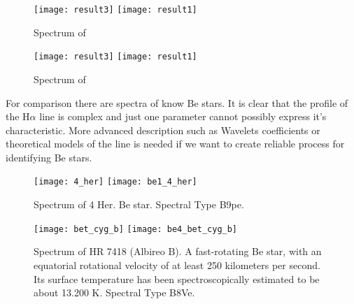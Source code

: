    \begin{figure}[!htbp]
      \begin{center}
        \leavevmode
        \ifpdf
        \texttt{[image: result3]}
        \else
        \texttt{[image: result1]}
        \fi
        \caption{Spectrum of }
        \label{FigResult3}
      \end{center}
    \end{figure}

   \begin{figure}[!htbp]
      \begin{center}
        \leavevmode
        \ifpdf
        \texttt{[image: result3]}
        \else
        \texttt{[image: result1]}
        \fi
        \caption{Spectrum of }
        \label{FigResult3}
      \end{center}
    \end{figure}


 
    For comparison there are spectra of know Be stars. It is clear
    that the profile of the H$\alpha$ line is complex and just one
    parameter cannot possibly express it's characteristic. More
    advanced description such as Wavelets coefficients or theoretical
    models of the line is needed if we want to create reliable
    process for identifying Be stars.

   \begin{figure}[!htbp]
      \begin{center}
        \leavevmode
        \ifpdf
        \texttt{[image: 4\_her]}
        \else
        \texttt{[image: be1\_4\_her]}
        \fi
        \caption{Spectrum of 4 Her. Be star. Spectral Type B9pe.  }
        \label{FigBe1}
      \end{center}
    \end{figure}

   \begin{figure}[!htbp]
      \begin{center}
        \leavevmode
        \ifpdf
        \texttt{[image: bet\_cyg\_b]}
        \else
        \texttt{[image: be4\_bet\_cyg\_b]}
        \fi
        \caption{Spectrum of HR 7418 (Albireo B). A fast-rotating Be
          star, with an equatorial rotational velocity of at least 250
          kilometers per second. Its surface temperature has been
          spectroscopically estimated to be about 13.200 K. Spectral
          Type B8Ve. }
        \label{FigBe4}
      \end{center}
    \end{figure}


